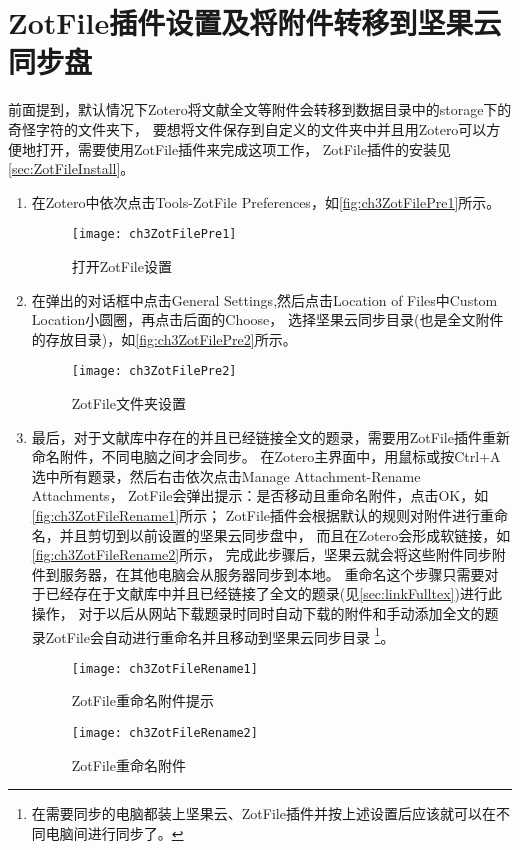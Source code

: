 \documentclass[cn,11pt,chinese]{elegantbook}
\begin{document}
		\section{ZotFile插件设置及将附件转移到坚果云同步盘}\label{sec:zotFilePre}
		前面提到，默认情况下Zotero将文献全文等附件会转移到数据目录中的storage下的奇怪字符的文件夹下，
		要想将文件保存到自定义的文件夹中并且用Zotero可以方便地打开，需要使用ZotFile插件来完成这项工作，
		ZotFile插件的安装见\cref{sec:ZotFileInstall}。
		\begin{enumerate}
			\item 在Zotero中依次点击Tools-ZotFile Preferences，如\autoref{fig:ch3ZotFilePre1}所示。
			\begin{figure}[t]
				\centering
				\texttt{[image: ch3ZotFilePre1]}
				\caption{打开ZotFile设置}
				\label{fig:ch3ZotFilePre1}
			\end{figure}
			\item 在弹出的对话框中点击General Settings,然后点击Location of Files中Custom Location小圆圈，再点击后面的Choose，
			选择坚果云同步目录(也是全文附件的存放目录)，如\autoref{fig:ch3ZotFilePre2}所示。
			\begin{figure}[htbp]
				\centering
				\texttt{[image: ch3ZotFilePre2]}
				\caption{ZotFile文件夹设置}
				\label{fig:ch3ZotFilePre2}
			\end{figure}
			\item 最后，对于文献库中存在的并且已经链接全文的题录，需要用ZotFile插件重新命名附件，不同电脑之间才会同步。
			在Zotero主界面中，用鼠标或按Ctrl+A选中所有题录，然后右击依次点击Manage Attachment-Rename Attachments，
			ZotFile会弹出提示：是否移动且重命名附件，点击OK，如\autoref{fig:ch3ZotFileRename1}所示；
			ZotFile插件会根据默认的规则对附件进行重命名，并且剪切到以前设置的坚果云同步盘中，
			而且在Zotero会形成软链接，如\autoref{fig:ch3ZotFileRename2}所示，
			完成此步骤后，坚果云就会将这些附件同步附件到服务器，在其他电脑会从服务器同步到本地。
			重命名这个步骤只需要对于已经存在于文献库中并且已经链接了全文的题录(见\cref{sec:linkFulltex})进行此操作，
			对于以后从网站下载题录时同时自动下载的附件和手动添加全文的题录ZotFile会自动进行重命名并且移动到坚果云同步目录
			\footnote{在需要同步的电脑都装上坚果云、ZotFile插件并按上述设置后应该就可以在不同电脑间进行同步了。}。
			
			\begin{figure}[htbp]
				\centering
				\texttt{[image: ch3ZotFileRename1]}
				\caption{ZotFile重命名附件提示}
				\label{fig:ch3ZotFileRename1}
			\end{figure}
			\begin{figure}[htbp]
				\centering
				\texttt{[image: ch3ZotFileRename2]}
				\caption{ZotFile重命名附件}
				\label{fig:ch3ZotFileRename2}
			\end{figure}
		\end{enumerate}
\end{document}
